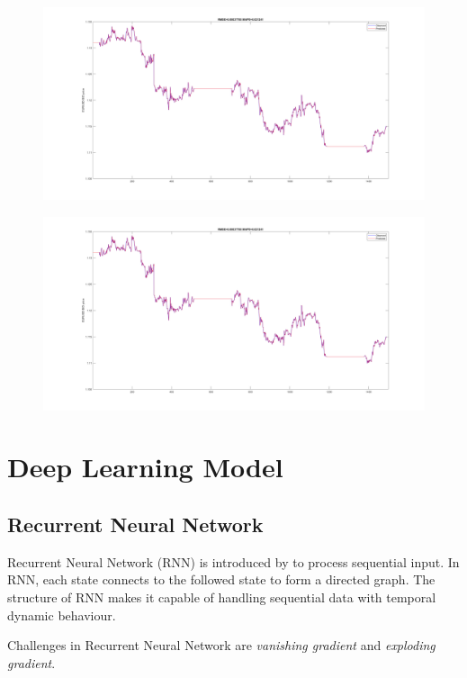 \documentclass[11pt]{article}
\begin{document}
\begin{figure}
  \centering
  \includegraphics[width=0.8\linewidth]{figs/arima_1_1_18_open.png}
  \caption{}
\end{figure}

\begin{figure}
  \centering
  \includegraphics[width=0.8\linewidth]{figs/arima_1_1_18_open.png}
  \caption{}
\end{figure}




\section{Deep Learning Model}
\subsection{Recurrent Neural Network}
Recurrent Neural Network (RNN) is introduced by \cite{rumelhart1988learning} to
process sequential input. In RNN, each state connects to the followed state to
form a directed graph. The structure of RNN makes it capable of handling
sequential data with temporal dynamic behaviour.

Challenges in Recurrent Neural Network are \textit{vanishing gradient} and
\textit{exploding gradient}.
\end{document}
